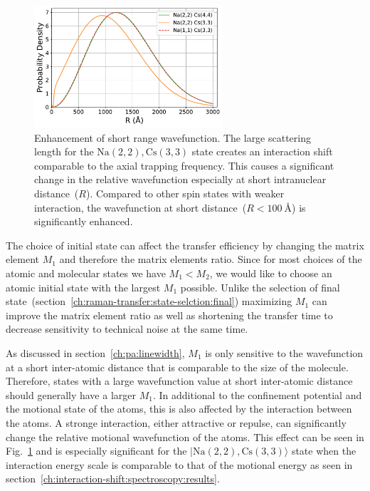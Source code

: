 \begin{figure}
  \centering
  \includegraphics[width=0.625\textwidth]{figures/raman_transfer_atomic_wavefunction.pdf}
  \caption[Enhancement of short range wavefunction]{
    Enhancement of short range wavefunction.
    The large scattering length for the $\mathrm{Na(2,2),Cs(3,3)}$ state
    creates an interaction shift comparable to the axial trapping frequency.
    This causes a significant change in the relative wavefunction especially at short
    intranuclear distance~($R$).
    Compared to other spin states with weaker interaction,
    the wavefunction at short distance~($R<100~\text{\AA}$) is significantly enhanced.
    \label{fig:raman-transfer:atomic-wavefunction}}
\end{figure}

The choice of initial state can affect the transfer efficiency
by changing the matrix element $M_1$ and therefore the matrix elements ratio.
Since for most choices of the atomic and molecular states we have $M_1<M_2$,
we would like to choose an atomic initial state with the largest $M_1$ possible.
Unlike the selection of final state~(section~\ref{ch:raman-transfer:state-selction:final})
maximizing $M_1$ can improve the matrix element ratio as well as
shortening the transfer time to decrease sensitivity to technical noise at the same time.

As discussed in section~\ref{ch:pa:linewidth},
$M_1$ is only sensitive to the wavefunction at a short inter-atomic distance
that is comparable to the size of the molecule.
Therefore, states with a large wavefunction value at short inter-atomic distance
should generally have a larger $M_1$.
In additional to the confinement potential and the motional state of the atoms,
this is also affected by the interaction between the atoms.
A stronge interaction, either attractive or repulse,
can significantly change the relative motional wavefunction of the atoms.
This effect can be seen in Fig.~\ref{fig:raman-transfer:atomic-wavefunction}
and is especially significant for the $|\mathrm{Na(2,2),Cs(3,3)}\rangle$ state
when the interaction energy scale is comparable to that of the motional energy
as seen in section~\ref{ch:interaction-shift:spectroscopy:results}.


